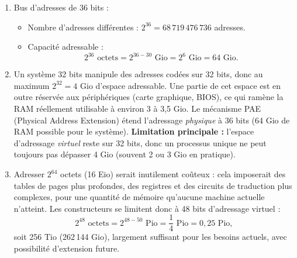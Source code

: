 \documentclass[11pt]{article}
\newcommand{\cle}[1]{{\popxbold\color{popdark}#1}}
\begin{document}
\begin{corrige}
\begin{enumerate}
    \item Bus d'adresses de 36 bits :
    \begin{itemize}
        \item[a)] Nombre d'adresses différentes : $2^{36} = 68\,719\,476\,736$ adresses.
        \item[b)] Capacité adressable :
        \[ 2^{36} \text{ octets} = 2^{36-30} \text{ Gio} = 2^6 \text{ Gio} = 64 \text{ Gio}. \]
    \end{itemize}
    \item Un système 32 bits manipule des adresses codées sur 32 bits, donc au maximum $2^{32} = 4$ Gio d'espace adressable. Une partie de cet espace est en outre réservée aux périphériques (carte graphique, BIOS), ce qui ramène la RAM réellement utilisable à environ 3 à 3,5 Gio. Le mécanisme \cle{PAE} (Physical Address Extension) étend l'adressage \emph{physique} à 36 bits (64 Gio de RAM possible pour le système). \textbf{Limitation principale :} l'espace d'adressage \emph{virtuel} reste sur 32 bits, donc un processus unique ne peut toujours pas dépasser 4 Gio (souvent 2 ou 3 Gio en pratique).
    \item Adresser $2^{64}$ octets (16 Eio) serait inutilement coûteux : cela imposerait des tables de pages plus profondes, des registres et des circuits de traduction plus complexes, pour une quantité de mémoire qu'aucune machine actuelle n'atteint. Les constructeurs se limitent donc à 48 bits d'adressage virtuel :
    \[ 2^{48} \text{ octets} = 2^{48-50} \text{ Pio} = \frac{1}{4} \text{ Pio} = 0,25 \text{ Pio}, \]
    soit 256 Tio (262\,144 Gio), largement suffisant pour les besoins actuels, avec possibilité d'extension future.
\end{enumerate}
\end{corrige}
\end{document}
